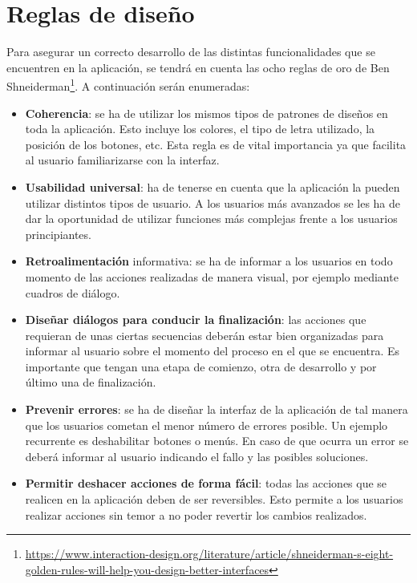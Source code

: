 \section{Reglas de diseño}
\label{cap4:sec:reglas}
Para asegurar un correcto desarrollo de las distintas funcionalidades que se encuentren en la aplicación, se tendrá en cuenta las ocho reglas de oro de Ben Shneiderman\footnote{\url{https://www.interaction-design.org/literature/article/shneiderman-s-eight-golden-rules-will-help-you-design-better-interfaces}}. A continuación serán enumeradas: 


\begin{itemize}
	
	\item \textbf{Coherencia}: se ha de utilizar los mismos tipos de patrones de diseños en toda la aplicación. Esto incluye los colores, el tipo de letra utilizado, la posición de los botones, etc. Esta regla es de vital importancia ya que facilita al usuario familiarizarse con la interfaz.
	
	\item \textbf{Usabilidad universal}: ha de tenerse en cuenta que la aplicación la pueden utilizar distintos tipos de usuario. A los usuarios más avanzados se les ha de dar la oportunidad de utilizar funciones más complejas frente a los usuarios principiantes. 
	
	\item \textbf{Retroalimentación} informativa: se ha de informar a los usuarios en todo momento de las acciones realizadas de manera visual, por ejemplo mediante cuadros de diálogo.
	
	\item \textbf{Diseñar diálogos para conducir la finalización}: las acciones que requieran de unas ciertas secuencias deberán estar bien organizadas para informar al usuario sobre el momento del proceso en el que se encuentra.  Es importante que tengan una etapa de comienzo, otra de desarrollo y por último una de finalización.
	\item \textbf{Prevenir errores}: se ha de diseñar la interfaz de la aplicación de tal manera que los usuarios cometan el menor número de errores posible. Un ejemplo recurrente es deshabilitar botones o menús. En caso de que ocurra un error se deberá informar al usuario indicando el fallo y las posibles soluciones. 
	
	\item \textbf{Permitir deshacer acciones de forma fácil}: todas las acciones que se realicen en la aplicación deben de ser reversibles. Esto permite a los usuarios realizar acciones sin temor a no poder revertir los cambios realizados.
	

\end{itemize}

